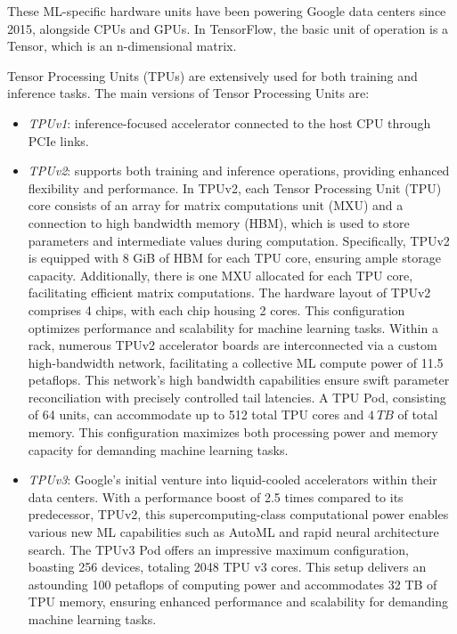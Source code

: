 These ML-specific hardware units have been powering Google data centers since 2015, alongside CPUs and GPUs. 
In TensorFlow, the basic unit of operation is a Tensor, which is an n-dimensional matrix.

Tensor Processing Units (TPUs) are extensively used for both training and inference tasks. 
The main versions of Tensor Processing Units are: 
\begin{itemize}
    \item \textit{TPUv1}: inference-focused accelerator connected to the host CPU through PCIe links. 
    \item \textit{TPUv2}: supports both training and inference operations, providing enhanced flexibility and performance.
        In TPUv2, each Tensor Processing Unit (TPU) core consists of an array for matrix computations unit (MXU) and a connection to high bandwidth memory (HBM), which is used to store parameters and intermediate values during computation.
        Specifically, TPUv2 is equipped with 8 GiB of HBM for each TPU core, ensuring ample storage capacity. 
        Additionally, there is one MXU allocated for each TPU core, facilitating efficient matrix computations.
        The hardware layout of TPUv2 comprises 4 chips, with each chip housing 2 cores. 
        This configuration optimizes performance and scalability for machine learning tasks.
        Within a rack, numerous TPUv2 accelerator boards are interconnected via a custom high-bandwidth network, facilitating a collective ML compute power of 11.5 petaflops. 
        This network's high bandwidth capabilities ensure swift parameter reconciliation with precisely controlled tail latencies.
        A TPU Pod, consisting of 64 units, can accommodate up to 512 total TPU cores and $4\:TB$ of total memory. 
        This configuration maximizes both processing power and memory capacity for demanding machine learning tasks.
    \item \textit{TPUv3}: Google's initial venture into liquid-cooled accelerators within their data centers. 
        With a performance boost of 2.5 times compared to its predecessor, TPUv2, this supercomputing-class computational power enables various new ML capabilities such as AutoML and rapid neural architecture search.
        The TPUv3 Pod offers an impressive maximum configuration, boasting 256 devices, totaling 2048 TPU v3 cores. 
        This setup delivers an astounding 100 petaflops of computing power and accommodates 32 TB of TPU memory, ensuring enhanced performance and scalability for demanding machine learning tasks.

\end{itemize}
